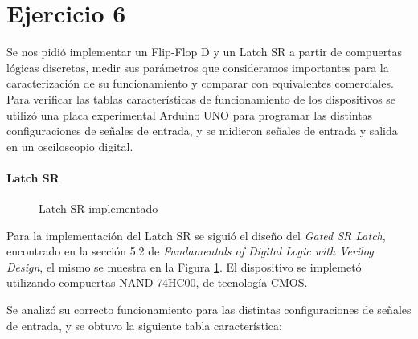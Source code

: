 
\part*{Ejercicio 6}
Se nos pidió implementar un Flip-Flop D y un Latch SR a partir de compuertas lógicas discretas, medir sus parámetros que consideramos importantes para la caracterización de su funcionamiento y comparar con equivalentes comerciales. Para verificar las tablas características de funcionamiento de los dispositivos se utilizó una placa experimental Arduino UNO para programar las distintas configuraciones de señales de entrada, y se midieron señales de entrada y salida en un osciloscopio digital. 

\subsection*{Latch SR}

%


\newcommand{\myboxa}
{%
    \begin{figure}
\begin{center}
\resizebox{.5\linewidth}{!}{\parbox{\linewidth}{}}
\caption{Latch SR implementado} 
\label{6_fig1}
\end{center}
    \end{figure}\par\noindent
}

\myboxa

Para la implementación del Latch SR se siguió el diseño del \emph{Gated SR Latch}, encontrado en la sección 5.2 de \emph{Fundamentals of Digital Logic with Verilog Design}, el mismo se muestra en la Figura \ref{6_fig1}. El dispositivo se implemetó utilizando compuertas NAND 74HC00, de tecnología CMOS.

Se analizó su correcto funcionamiento para las distintas configuraciones de señales de entrada, y se obtuvo la siguiente tabla característica:

